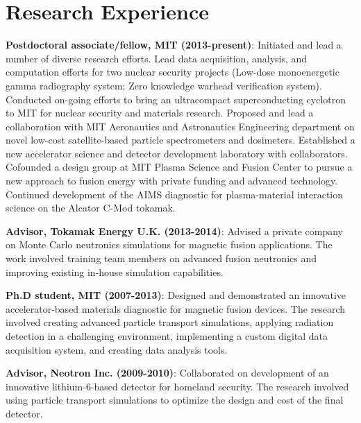 \documentclass[10pt]{article}
\begin{document}
\section{Research Experience}
\begin{innerlist}
\item \textbf{Postdoctoral associate/fellow, MIT (2013-present)}:
  Initiated and lead a number of diverse research efforts. Lead data
  acquisition, analysis, and computation efforts for two nuclear
  security projects (Low-dose monoenergetic gamma radiography system;
  Zero knowledge warhead verification system). Conducted on-going
  efforts to bring an ultracompact superconducting cyclotron to MIT
  for nuclear security and materials research. Proposed and lead a
  collaboration with MIT Aeronautics and Astronautics Engineering
  department on novel low-cost satellite-based particle spectrometers
  and dosimeters. Established a new accelerator science and detector
  development laboratory with collaborators. Cofounded a design group
  at MIT Plasma Science and Fusion Center to pursue a new approach to
  fusion energy with private funding and advanced
  technology. Continued development of the AIMS diagnostic for
  plasma-material interaction science on the Alcator C-Mod
  tokamak.\vspace{0.2cm}
  
\item \textbf{Advisor, Tokamak Energy U.K. (2013-2014)}: Advised a
  private company on Monte Carlo neutronics simulations for magnetic
  fusion applications. The work involved training team members on
  advanced fusion neutronics and improving existing in-house
  simulation capabilities.\vspace{0.2cm}

\item \textbf{Ph.D student, MIT (2007-2013)}: Designed and
  demonstrated an innovative accelerator-based materials diagnostic
  for magnetic fusion devices. The research involved creating advanced
  particle transport simulations, applying radiation detection in a
  challenging environment, implementing a custom digital data
  acquisition system, and creating data analysis tools.\vspace{0.2cm}

\item \textbf{Advisor, Neotron Inc. (2009-2010)}: Collaborated on
  development of an innovative lithium-6-based detector for homeland
  security. The research involved using particle transport simulations
  to optimize the design and cost of the final detector.\vspace{0.2cm}
  

\end{innerlist}
\end{document}
